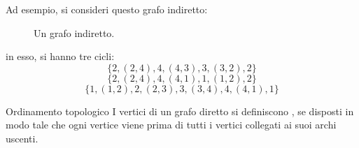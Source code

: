 \documentclass[a4paper, 12pt]{report}
\begin{document}
    \begin{example}
        Ad esempio, si consideri questo grafo indiretto:

        \begin{figure}[H]
            \centering
            \caption{Un grafo indiretto.}
        \end{figure}

        in esso, si hanno tre cicli: $$\{2, (2, 4), 4, (4,3), 3, (3, 2), 2\}$$ $$\{2, (2, 4), 4, (4, 1), 1, (1, 2), 2\}$$ $$\{1, (1, 2), 2, (2, 3), 3, (3, 4), 4, (4, 1), 1\}$$
    \end{example}

    \begin{frameddefn}{Ordinamento topologico}
        I vertici di un grafo diretto si definiscono , se disposti in modo tale che ogni vertice viene prima di tutti i vertici collegati ai suoi archi uscenti.
    \end{frameddefn}
\end{document}
